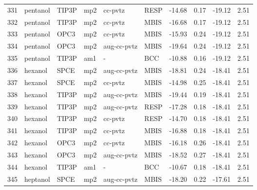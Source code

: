 \begin{tabular}{llllllrrrr}
331 &                       pentanol &      TIP3P &      mp2 &      cc-pvtz &         RESP & -14.68 &      0.17 &      -19.12 &     2.51 \\
332 &                       pentanol &      TIP3P &      mp2 &      cc-pvtz &         MBIS & -16.68 &      0.17 &      -19.12 &     2.51 \\
333 &                       pentanol &       OPC3 &      mp2 &      cc-pvtz &         MBIS & -15.93 &      0.24 &      -19.12 &     2.51 \\
334 &                       pentanol &       OPC3 &      mp2 &  aug-cc-pvtz &         MBIS & -19.64 &      0.24 &      -19.12 &     2.51 \\
335 &                       pentanol &      TIP3P &      am1 &            - &          BCC & -10.88 &      0.16 &      -19.12 &     2.51 \\
336 &                        hexanol &       SPCE &      mp2 &  aug-cc-pvtz &         MBIS & -18.81 &      0.24 &      -18.41 &     2.51 \\
337 &                        hexanol &       SPCE &      mp2 &      cc-pvtz &         MBIS & -14.98 &      0.25 &      -18.41 &     2.51 \\
338 &                        hexanol &      TIP3P &      mp2 &  aug-cc-pvtz &         MBIS & -19.44 &      0.19 &      -18.41 &     2.51 \\
339 &                        hexanol &      TIP3P &      mp2 &  aug-cc-pvtz &         RESP & -17.28 &      0.18 &      -18.41 &     2.51 \\
340 &                        hexanol &      TIP3P &      mp2 &      cc-pvtz &         RESP & -14.70 &      0.18 &      -18.41 &     2.51 \\
341 &                        hexanol &      TIP3P &      mp2 &      cc-pvtz &         MBIS & -16.88 &      0.18 &      -18.41 &     2.51 \\
342 &                        hexanol &       OPC3 &      mp2 &      cc-pvtz &         MBIS & -16.18 &      0.26 &      -18.41 &     2.51 \\
343 &                        hexanol &       OPC3 &      mp2 &  aug-cc-pvtz &         MBIS & -18.52 &      0.27 &      -18.41 &     2.51 \\
344 &                        hexanol &      TIP3P &      am1 &            - &          BCC & -10.67 &      0.18 &      -18.41 &     2.51 \\
345 &                       heptanol &       SPCE &      mp2 &  aug-cc-pvtz &         MBIS & -18.20 &      0.22 &      -17.61 &     2.51 \\

\end{tabular}
